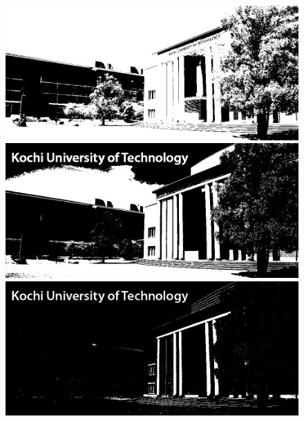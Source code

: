 \begin{figure}[H]
    \begin{minipage}[b]{.7\textwidth}
        \centering
        \begin{minipage}[b]{.3\textwidth}
            \centering
            \includegraphics[keepaspectratio,width=\textwidth]{../../Figures/05_41.png}
        \end{minipage}
        \begin{minipage}[b]{.3\textwidth}
            \centering
            \includegraphics[keepaspectratio,width=\textwidth]{../../Figures/05_42.png}
        \end{minipage}
        \begin{minipage}[b]{.3\textwidth}
            \centering
            \includegraphics[keepaspectratio,width=\textwidth]{../../Figures/05_43.png}

\end{minipage}
\end{minipage}
\end{figure}
